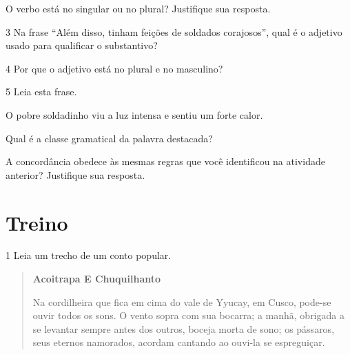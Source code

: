 \begin{conteudo}
\begin{conteudo}
\begin{conteudo}
\begin{conteudo}
\begin{escolha}
\item O verbo está no singular ou no plural? Justifique sua resposta.
\item{}
\end{escolha}

\num{3} Na frase ``Além disso, tinham feições de soldados corajosos'', qual é o
adjetivo usado para qualificar o substantivo?


\num{4} Por que o adjetivo está no plural e no masculino?


\pagebreak
\num{5} Leia esta frase.

\begin{mdframed}[linewidth=10pt,linecolor=salmao!20,backgroundcolor=salmao!20,roundcorner=20pt]
O pobre soldadinho viu a luz intensa e sentiu um forte calor.
\end{mdframed}

\begin{escolha}
\item Qual é a classe gramatical da palavra destacada?
\item{}

\item A concordância obedece às mesmas regras que você identificou na
  atividade anterior? Justifique sua resposta.
\item{}
\end{escolha}

\section{Treino}

\num{1} Leia um trecho de um conto popular.

\begin{quote}
\textbf{Acoitrapa E Chuquilhanto}

Na cordilheira que fica em cima do vale de Yyucay, em Cusco,
pode-se ouvir todos os sons. O vento sopra com sua bocarra;
a manhã, obrigada a se levantar sempre antes dos outros,
boceja morta de sono; os pássaros, seus eternos namorados,
acordam cantando ao ouvi-la se espreguiçar.


\end{quote}
\end{conteudo}
\end{conteudo}
\end{conteudo}
\end{conteudo}

